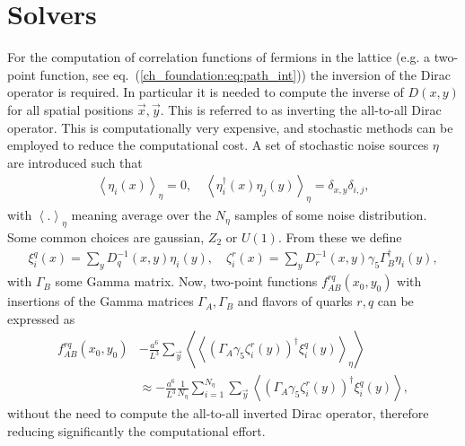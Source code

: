 
\chapter{Solvers}
\label{appex_solvers}

For the computation of correlation functions of fermions in the lattice (e.g. a two-point function, see eq.~(\ref{ch_foundation:eq:path_int})) the inversion of the Dirac operator is required. In particular it is needed to compute the inverse of $D(x,y)$ for all spatial positions $\vec{x},\vec{y}$. This is referred to as inverting the all-to-all Dirac operator. This is computationally very expensive, and stochastic methods can be employed to reduce the computational cost. A set of stochastic noise sources $\eta$ are introduced such that
\begin{gather}
\left<\eta_i(x)\right>_{\eta}=0, \quad \left<\eta_i^{\dagger}(x)\eta_j(y)\right>_{\eta}=\delta_{x,y}\delta_{i,j},
\end{gather}
with $\left<.\right>_{\eta}$ meaning average over the $N_{\eta}$ samples of some noise distribution. Some common choices are gaussian, $Z_2$ or $U(1)$. From these we define
\begin{gather}
\xi_i^q(x)=\sum_yD^{-1}_q(x,y)\eta_i(y), \quad \zeta_i^r(x)=\sum_yD^{-1}_r(x,y)\gamma_5\Gamma_B^{\dagger}\eta_i(y),
\end{gather}
with $\Gamma_B$ some Gamma matrix. Now, two-point functions $f^{rq}_{AB}(x_0,y_0)$ with insertions of the Gamma matrices $\Gamma_A,\Gamma_B$ and flavors of quarks $r,q$ can be expressed as
\begin{align}
f^{rq}_{AB}(x_0,y_0)&-\frac{a^6}{L^3}\sum_{\vec{y}}\left<\left<(\Gamma_A\gamma_5\zeta^r_i(y))^{\dagger}\xi^q_i(y)\right>_{\eta}\right> \\
&\approx -\frac{a^6}{L^3}\frac{1}{N_{\eta}}\sum_{i=1}^{N_{\eta}}\sum_{\vec{y}}\left<(\Gamma_A\gamma_5\zeta^r_i(y))^{\dagger}\xi^q_i(y)\right>,
\end{align}
without the need to compute the all-to-all inverted Dirac operator, therefore reducing significantly the computational effort.

